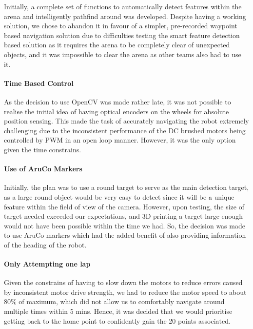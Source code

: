 \documentclass{article}
\begin{document}
Initially, a complete set of functions to automatically detect features within the arena and intelligently pathfind around was developed. Despite having a working solution, we chose to abandon it in favour of a simpler, pre-recorded waypoint based navigation solution due to difficulties testing the smart feature detection based solution as it requires the arena to be completely clear of unexpected objects, and it was impossible to clear the arena as other teams also had to use it.

\paragraph{Time Based Control}

As the decision to use OpenCV was made rather late, it was not possible to realise the initial idea of having optical encoders on the wheels for absolute position sensing. This made the task of accurately navigating the robot extremely challenging due to the inconsistent performance of the DC brushed motors being controlled by PWM in an open loop manner. However, it was the only option given the time constrains.

\paragraph{Use of AruCo Markers}

Initially, the plan was to use a round target to serve as the main detection target, as a large round object would be very easy to detect since it will be a unique feature within the field of view of the camera. However, upon testing, the size of target needed exceeded our expectations, and 3D printing a target large enough would not have been possible within the time we had. So, the decision was made to use AruCo markers which had the added benefit of also providing information of the heading of the robot.

\paragraph{Only Attempting one lap}
Given the constrains of having to slow down the motors to reduce errors caused by inconsistent motor drive strength, we had to reduce the motor speed to about $80\%$ of maximum, which did not allow us to comfortably navigate around multiple times within 5 mins. Hence, it was decided that we would prioritise getting back to the home point to confidently gain the 20 points associated.
\end{document}
